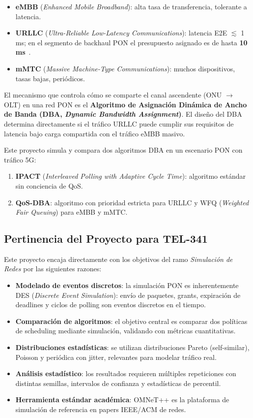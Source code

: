 \documentclass[12pt, letterpaper]{article}
\begin{document}
\begin{itemize}[leftmargin=1.5em]
  \item \textbf{eMBB} (\textit{Enhanced Mobile Broadband}): alta tasa de transferencia, tolerante a latencia.
  \item \textbf{URLLC} (\textit{Ultra-Reliable Low-Latency Communications}): latencia E2E $\lesssim$ 1 ms; en el segmento de backhaul PON el presupuesto asignado es de hasta \textbf{10 ms}~\cite{3gpp5g}.
  \item \textbf{mMTC} (\textit{Massive Machine-Type Communications}): muchos dispositivos, tasas bajas, periódicos.
\end{itemize}

El mecanismo que controla cómo se comparte el canal ascendente (ONU $\to$ OLT) en una red PON es el \textbf{Algoritmo de Asignación Dinámica de Ancho de Banda (DBA, \textit{Dynamic Bandwidth Assignment})}. El diseño del DBA determina directamente si el tráfico URLLC puede cumplir sus requisitos de latencia bajo carga compartida con el tráfico eMBB masivo.

Este proyecto simula y compara dos algoritmos DBA en un escenario PON con tráfico 5G:

\begin{enumerate}[leftmargin=1.5em]
  \item \textbf{IPACT} (\textit{Interleaved Polling with Adaptive Cycle Time}): algoritmo estándar sin conciencia de QoS.
  \item \textbf{QoS-DBA}: algoritmo con prioridad estricta para URLLC y WFQ (\textit{Weighted Fair Queuing}) para eMBB y mMTC.
\end{enumerate}

\subsection{Pertinencia del Proyecto para TEL-341}

Este proyecto encaja directamente con los objetivos del ramo \textit{Simulación de Redes} por las siguientes razones:

\begin{itemize}[leftmargin=1.5em]
  \item \textbf{Modelado de eventos discretos}: la simulación PON es inherentemente DES (\textit{Discrete Event Simulation}): envío de paquetes, grants, expiración de deadlines y ciclos de polling son eventos discretos en el tiempo.
  \item \textbf{Comparación de algoritmos}: el objetivo central es comparar dos políticas de scheduling mediante simulación, validando con métricas cuantitativas.
  \item \textbf{Distribuciones estadísticas}: se utilizan distribuciones Pareto (self-similar), Poisson y periódica con jitter, relevantes para modelar tráfico real.
  \item \textbf{Análisis estadístico}: los resultados requieren múltiples repeticiones con distintas semillas, intervalos de confianza y estadísticas de percentil.
  \item \textbf{Herramienta estándar académica}: OMNeT++ es la plataforma de simulación de referencia en papers IEEE/ACM de redes.
\end{itemize}
\end{document}
